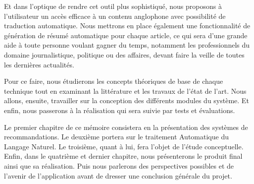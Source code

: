 Et dans l'optique de rendre cet outil plus sophistiqué, nous proposons à l'utilisateur un accès efficace à un contenu anglophone avec possibilité de traduction automatique. Nous mettrons en place également une fonctionnalité de génération de résumé automatique pour chaque article, ce qui sera d'une grande aide à toute personne voulant gagner du temps, notamment les professionnels du domaine journalistique, politique ou des affaires, devant faire la veille de toutes les dernières actualités.

Pour ce faire, nous étudierons les concepts théoriques de base de chaque technique tout en examinant la littérature et les travaux de l'état de l'art. Nous allons, ensuite, travailler sur la conception des différents modules du système. Et enfin, nous passerons à la réalisation qui sera suivie par tests et évaluations.

Le premier chapitre de ce mémoire consistera en la présentation des systèmes de recommandations. Le deuxième portera sur le traitement Automatique du Langage Naturel. Le troisième, quant à lui, fera l'objet de l'étude conceptuelle. Enfin, dans le quatrième et dernier chapitre, nous présenterons le produit final ainsi que sa réalisation. Puis nous parlerons des perspectives possibles et de l'avenir de l'application avant de dresser une conclusion générale du projet.

